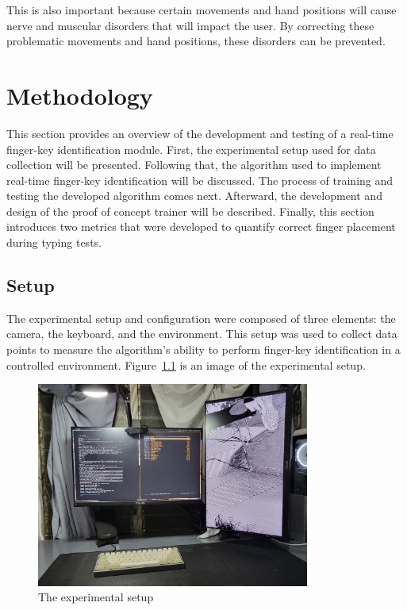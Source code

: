 \documentclass{report}
\begin{document}
This is also important because certain movements and hand positions will cause
nerve and muscular disorders that will impact the user. By correcting these
problematic movements and hand positions, these disorders can be prevented.

\chapter{Methodology}

This section provides an overview of the development and testing of a real-time
finger-key identification module. First, the experimental setup used for data
collection will be presented. Following that, the algorithm used to implement
real-time finger-key identification will be discussed. The process of training
and testing the developed algorithm comes next. Afterward, the development and
design of the proof of concept trainer will be described. Finally, this section
introduces two metrics that were developed to quantify correct finger placement
during typing tests.

\section{Setup}
\label{section:metho-setup}

The experimental setup and configuration were composed of three elements: the
camera, the keyboard, and the environment. This setup was used to collect data
points to measure the algorithm's ability to perform finger-key identification
in a controlled environment. Figure~\ref{fig:metho-setup} is an image of the
experimental setup.


\begin{figure}[H]
	\centering
	\includegraphics[width=0.8\textwidth]{full-setup.jpg}
	\caption{The experimental setup}
	\label{fig:metho-setup}
	\centering
\end{figure}
\end{document}

